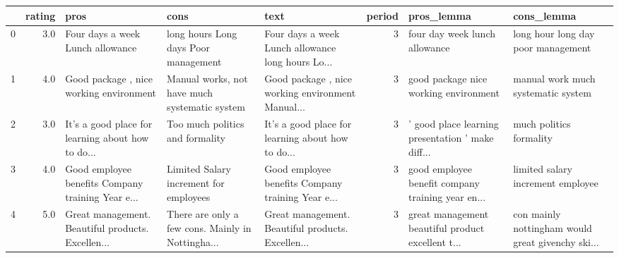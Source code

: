 \begin{tabular}{lrlllrll}
\toprule
{} &  rating &                                               pros &                                               cons &                                               text &  period &                                         pros\_lemma &                                         cons\_lemma \\
\midrule
0 &     3.0 &                   Four days a week Lunch allowance &               long hours Long days Poor management &  Four days a week Lunch allowance long hours Lo... &       3 &                      four day week lunch allowance &                 long hour long day poor management \\
1 &     4.0 &            Good package , nice working environment &      Manual works, not have much systematic system &  Good package , nice working environment Manual... &       3 &              good package nice working environment &                 manual work much systematic system \\
2 &     3.0 &  It’s a good place for learning about how to do... &                    Too much politics and formality &  It’s a good place for learning about how to do... &       3 &  ’ good place learning presentation ’ make diff... &                            much politics formality \\
3 &     4.0 &  Good employee benefits Company training Year e... &             Limited Salary increment for employees &  Good employee benefits Company training Year e... &       3 &  good employee benefit company training year en... &                  limited salary increment employee \\
4 &     5.0 &  Great management. Beautiful products. Excellen... &  There are only a few cons. Mainly in Nottingha... &  Great management. Beautiful products. Excellen... &       3 &  great management beautiful product excellent t... &  con mainly nottingham would great givenchy ski... \\
\bottomrule
\end{tabular}
